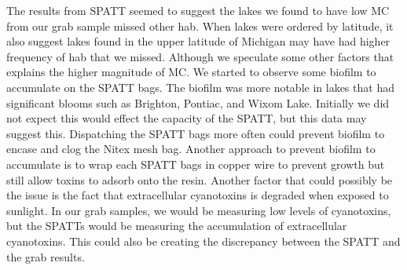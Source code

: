 The results from SPATT seemed to suggest the lakes we found to have low MC from our grab sample missed other \gls{hab}. When lakes were ordered by latitude, it also suggest lakes found in the upper latitude of Michigan may have had higher frequency of \gls{hab} that we missed. Although we speculate some other factors that explains the higher magnitude of MC. We started to observe  some biofilm to accumulate on the SPATT bags. The biofilm was more notable in lakes that had significant blooms such as Brighton, Pontiac, and Wixom Lake. Initially we did not expect this would effect the capacity of the SPATT, but this data may suggest this. Dispatching the SPATT bags more often could prevent biofilm to encase and clog the Nitex mesh bag. Another approach to prevent biofilm to accumulate is to wrap each SPATT bags in copper wire to prevent growth but still allow toxins to adsorb onto the resin. Another factor that could possibly be the issue is the fact that extracellular cyanotoxins is degraded when exposed to sunlight. In our grab samples, we would be measuring low levels of cyanotoxins, but the SPATTs would be measuring the accumulation of extracellular cyanotoxins. This could also be creating the discrepancy between the SPATT and the grab results. 




